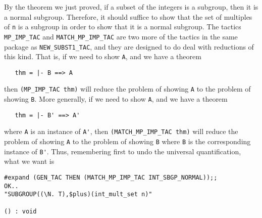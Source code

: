 By the theorem we just proved, if a subset of the integers is a
subgroup, then it is a normal subgroup.  Therefore, it should suffice
to show that the set of multiples of {\small\tt n} is a subgroup in
order to show that it is a normal subgroup.  The tactics
{\small\verb+MP_IMP_TAC+} and {\small\verb+MATCH_MP_IMP_TAC+}
are two more of the tactics in the same package as
{\small\verb+NEW_SUBST1_TAC+}, and they are designed to do deal
with reductions of this kind.  That is, if we need to show {\small\tt A},
and we have a theorem
\begin{verbatim}
   thm = |- B ==> A
\end{verbatim}
then {\small\verb+(MP_IMP_TAC thm)+} will reduce the problem of
showing {\small\tt A} to the problem of showing {\small\tt B}.  More
generally, if we need to show {\small\tt A}, and we have a theorem
\begin{verbatim}
   thm = |- B' ==> A'
\end{verbatim}
where {\small\tt A} is an instance of {\small\verb+A'+}, then
{\small\verb+(MATCH_MP_IMP_TAC thm)+} will reduce the problem of
showing {\small\tt A} to the problem of showing {\small\tt B} where
{\small\tt B} is the corresponding instance of {\small\verb+B'+}.
Thus, remembering first to undo the universal quantification, what we
want is
\begin{session}
\begin{verbatim}
#expand (GEN_TAC THEN (MATCH_MP_IMP_TAC INT_SBGP_NORMAL));;
OK..
"SUBGROUP((\N. T),$plus)(int_mult_set n)"

() : void
\end{verbatim}
\end{session}

